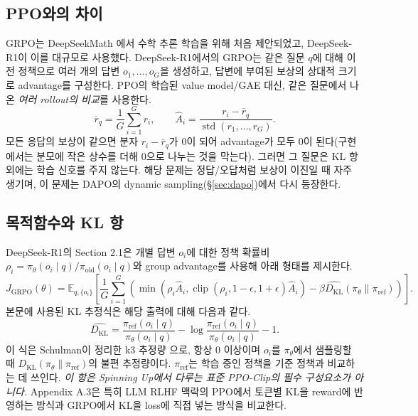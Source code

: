 \documentclass[11pt,a4paper]{article}
\newcommand{\E}{\mathbb{E}}
\newcommand{\KL}{D_{\mathrm{KL}}}
\newcommand{\clip}{\operatorname{clip}}
\begin{document}
\subsection{PPO와의 차이}
GRPO는 DeepSeekMath \cite{deepseekmath}에서 수학 추론 학습을 위해 처음 제안되었고, DeepSeek-R1이 이를 대규모로 사용했다. DeepSeek-R1에서의 GRPO는 같은 질문 \(q\)에 대해 이전 정책으로 여러 개의 답변 \(o_1,\dots,o_G\)을 생성하고, 답변에 부여된 보상의 상대적 크기로 advantage를 구성한다. PPO의 학습된 value model/GAE 대신, 같은 질문에서 나온 \emph{여러 rollout의 비교}를 사용한다.
\begin{equation}
 \overline r_q=\frac1G\sum_{i=1}^G r_i,\qquad
 \widehat A_i=\frac{r_i-\overline r_q}{\operatorname{std}(r_1,\dots,r_G)}.
\end{equation}
모든 응답의 보상이 같으면 분자 \(r_i-\overline r_q\)가 0이 되어 advantage가 모두 0이 된다(구현에서는 분모에 작은 상수를 더해 0으로 나누는 것을 막는다). 그러면 그 질문은 KL 항 외에는 학습 신호를 주지 않는다. 해당 문제는 정답/오답처럼 보상이 이진일 때 자주 생기며, 이 문제는 DAPO의 dynamic sampling(\S\ref{sec:dapo})에서 다시 등장한다.

\subsection{목적함수와 KL 항}
DeepSeek-R1의 Section 2.1은 개별 답변 \(o_i\)에 대한 정책 확률비 \(\rho_i=\pi_\theta(o_i\mid q)/\pi_{\mathrm{old}}(o_i\mid q)\)와 group advantage를 사용해 아래 형태를 제시한다.
\begin{equation}
 J_{\mathrm{GRPO}}(\theta)=\E_{q,\{o_i\}}
 \left[\frac1G\sum_{i=1}^G\left(
 \min\!\left(\rho_i\widehat A_i,\clip(\rho_i,1-\epsilon,1+\epsilon)\widehat A_i\right)
 -\beta\widehat{\KL}(\pi_\theta\|\pi_{\mathrm{ref}})\right)\right].
\end{equation}
본문에 사용된 KL 추정식은 해당 출력에 대해 다음과 같다.
\begin{equation}
 \widehat{\KL}=\frac{\pi_{\mathrm{ref}}(o_i\mid q)}{\pi_\theta(o_i\mid q)}
 -\log\frac{\pi_{\mathrm{ref}}(o_i\mid q)}{\pi_\theta(o_i\mid q)}-1.
\end{equation}
이 식은 Schulman이 정리한 k3 추정량 \cite{kl-approx}으로, 항상 0 이상이며 \(o_i\)를 \(\pi_\theta\)에서 샘플링할 때 \(\KL(\pi_\theta\|\pi_{\mathrm{ref}})\)의 불편 추정량이다. \(\pi_{\mathrm{ref}}\)는 학습 중인 정책을 기준 정책과 비교하는 데 쓰인다. \emph{이 항은 Spinning Up에서 다루는 표준 PPO-Clip의 필수 구성요소가 아니다.} Appendix A.3은 특히 LLM RLHF 맥락의 PPO에서 토큰별 KL을 reward에 반영하는 방식과 GRPO에서 KL을 loss에 직접 넣는 방식을 비교한다.
\end{document}
